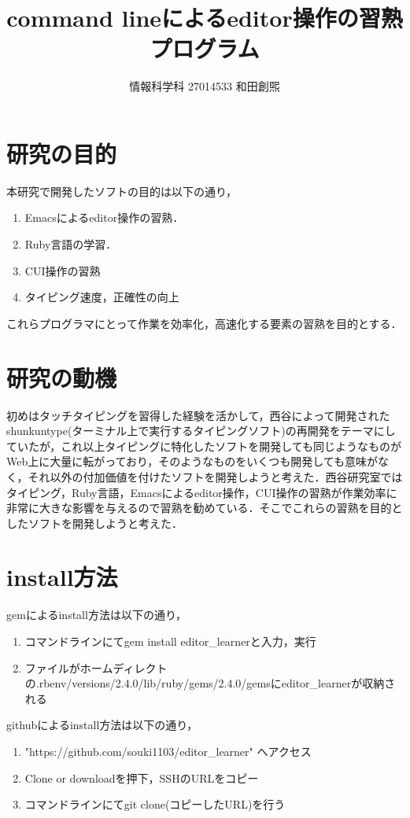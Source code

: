 \documentclass[a4j,twocolumn]{jsarticle}
\def\tightlist{\itemsep1pt\parskip0pt\parsep0pt}
\begin{document}
\title{command lineによるeditor操作の習熟プログラム}
\author{情報科学科 \hspace{5mm} 27014533 \hspace{5mm} 和田創煕}
\date{}
\maketitle

\section{研究の目的}
本研究で開発したソフトの目的は以下の通り，
\begin{enumerate}
\def\labelenumi{\arabic{enumi}.}
\tightlist
\item
Emacsによるeditor操作の習熟．
\item
Ruby言語の学習．
\item
CUI操作の習熟
\item
タイピング速度，正確性の向上
\end{enumerate}
これらプログラマにとって作業を効率化，高速化する要素の習熟を目的とする．


\section{研究の動機}
初めはタッチタイピングを習得した経験を活かして，西谷によって開発されたshunkuntype(ターミナル上で実行するタイピングソフト)の再開発をテーマにしていたが，これ以上タイピングに特化したソフトを開発しても同じようなものがWeb上に大量に転がっており，そのようなものをいくつも開発しても意味がなく，それ以外の付加価値を付けたソフトを開発しようと考えた．西谷研究室ではタイピング，Ruby言語，Emacsによるeditor操作，CUI操作の習熟が作業効率に非常に大きな影響を与えるので習熟を勧めている．そこでこれらの習熟を目的としたソフトを開発しようと考えた．

\section{install方法}
gemによるinstall方法は以下の通り，
\begin{enumerate}
\def\labelenumi{\arabic{enumi}.}
\tightlist
\item
  コマンドラインにてgem install editor\_learnerと入力，実行
\item
  ファイルがホームディレクトの.rbenv/versions/2.4.0/lib/ruby/gems/2.4.0/gemsにeditor\_learnerが収納される
\end{enumerate}
githubによるinstall方法は以下の通り，
\begin{enumerate}
\def\labelenumi{\arabic{enumi}.}
\tightlist
\item
  "https://github.com/souki1103/editor\_learner" へアクセス
\item
  Clone or downloadを押下，SSHのURLをコピー
\item
  コマンドラインにてgit clone(コピーしたURL)を行う
\end{enumerate}
\end{document}
